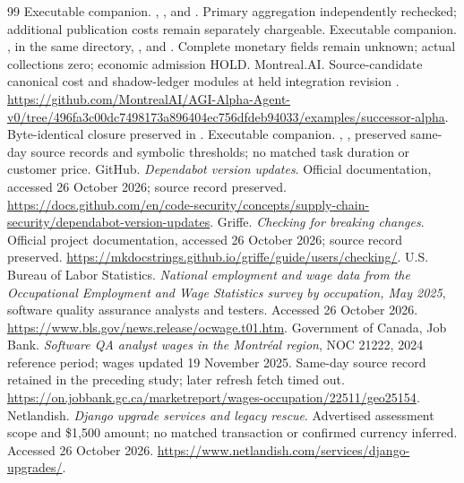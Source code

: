 \documentclass[11pt,a4paper]{article}
\begin{document}
\begin{thebibliography}{99}
 Executable companion. , , and . Primary aggregation independently rechecked; additional publication costs remain separately chargeable.
 Executable companion. ,  in the same directory, , and . Complete monetary fields remain unknown; actual collections zero; economic admission HOLD.
 Montreal.AI. Source-candidate canonical cost and shadow-ledger modules at held integration revision . \url{https://github.com/MontrealAI/AGI-Alpha-Agent-v0/tree/496fa3c00dc7498173a896404ec756dfdeb94033/examples/successor-alpha}. Byte-identical closure preserved in .
 Executable companion. , , preserved same-day source records and symbolic thresholds; no matched task duration or customer price.
 GitHub. \emph{Dependabot version updates}. Official documentation, accessed 26 October 2026; source record preserved. \url{https://docs.github.com/en/code-security/concepts/supply-chain-security/dependabot-version-updates}.
 Griffe. \emph{Checking for breaking changes}. Official project documentation, accessed 26 October 2026; source record preserved. \url{https://mkdocstrings.github.io/griffe/guide/users/checking/}.
 U.S. Bureau of Labor Statistics. \emph{National employment and wage data from the Occupational Employment and Wage Statistics survey by occupation, May 2025}, software quality assurance analysts and testers. Accessed 26 October 2026. \url{https://www.bls.gov/news.release/ocwage.t01.htm}.
 Government of Canada, Job Bank. \emph{Software QA analyst wages in the Montr\'eal region}, NOC 21222, 2024 reference period; wages updated 19 November 2025. Same-day source record retained in the preceding study; later refresh fetch timed out. \url{https://on.jobbank.gc.ca/marketreport/wages-occupation/22511/geo25154}.
 Netlandish. \emph{Django upgrade services and legacy rescue}. Advertised assessment scope and \$1,500 amount; no matched transaction or confirmed currency inferred. Accessed 26 October 2026. \url{https://www.netlandish.com/services/django-upgrades/}.

\end{thebibliography}
\end{document}
